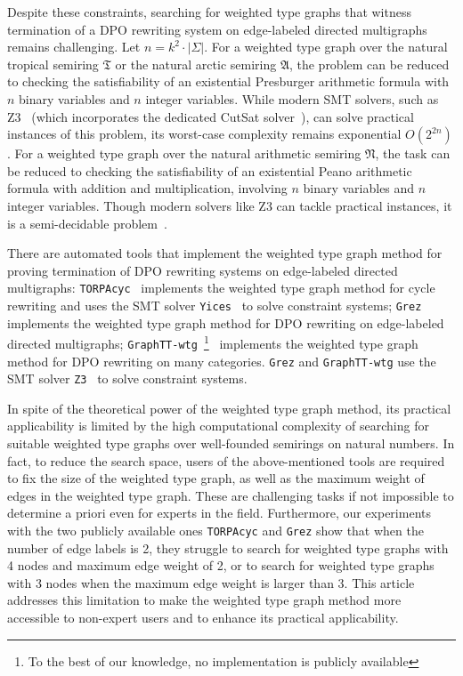     Despite these constraints, searching for weighted type graphs that witness termination of a DPO rewriting system on edge-labeled directed multigraphs
    remains challenging. 
    Let $n = k^2 \cdot | \Sigma |$.
    For a weighted type graph over the natural tropical semiring $\mathfrak{T}$ or the natural arctic semiring $\mathfrak{A}$, the problem can be reduced to checking the satisfiability of an existential Presburger arithmetic formula with $n$ binary variables and $n$ integer variables.
    While modern SMT solvers, such as Z3~\cite{arithmetic2024z3} (which incorporates the dedicated CutSat solver~\cite{z3ilp_cutsat}), can solve practical instances of this problem, its worst-case complexity remains exponential \( O(2^{2n}) \).
     For a weighted type graph over the natural arithmetic semiring $\mathfrak{N}$, the task can be reduced to checking the satisfiability of an existential Peano arithmetic formula with addition and multiplication, involving $n$ binary variables and $n$ integer variables. Though modern solvers like Z3 can tackle practical instances, it is a semi-decidable problem~\cite{matiyasevivc2003enumerable}.

    There are automated tools that implement the weighted type graph method for proving termination of DPO rewriting systems on edge-labeled directed multigraphs: 
    \texttt{TORPAcyc}~\cite{TORPAcyc} implements the weighted type graph method for cycle rewriting and uses the SMT solver \texttt{Yices}~\cite{yices} to solve constraint systems;
    \texttt{Grez}~\cite{grez} implements the weighted type graph method for DPO rewriting on edge-labeled directed multigraphs; \texttt{GraphTT-wtg}~\footnote{To the best of our knowledge, no implementation is publicly available}~\cite{endrullis2024generalized_arxiv_v3} implements the weighted type graph method for DPO rewriting on many categories.
    \texttt{Grez} and \texttt{GraphTT-wtg}
    use  the SMT solver \texttt{Z3}~\cite{de2008z3} to solve constraint systems.


    In spite of the theoretical power of the weighted type graph method, its practical applicability is limited by the high computational complexity of searching for suitable weighted type graphs over well-founded semirings on 
    natural numbers. In fact, to reduce the search space, users of the above-mentioned tools are required
     to fix the size of the weighted type graph, as well as the maximum weight of edges in the weighted type graph. These are challenging tasks if not impossible to determine a priori even for experts in the field. 
    Furthermore, our experiments with the two publicly available ones \texttt{TORPAcyc} and \texttt{Grez} show that when the number of edge labels is 2, they struggle to search for weighted type graphs with 4 nodes and maximum edge weight of 2, or to search for weighted type graphs with 3 nodes when the maximum edge weight is larger than 3. 
    This article addresses this limitation to make the weighted type graph method more accessible to non-expert users and to enhance its practical applicability.

